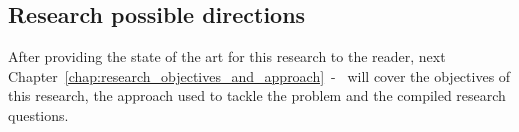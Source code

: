 
\cite{analysisng_distributed_trace_data}

\subsection{Research possible directions}
\label{subsec:research_possible_directions}


After providing the state of the art for this research to the reader, next Chapter~\ref{chap:research_objectives_and_approach}~-~ will cover the objectives of this research, the approach used to tackle the problem and the compiled research questions.

\checkoddpage
{}
{ %
    \newpage
    \blankpage}
{ %
}
